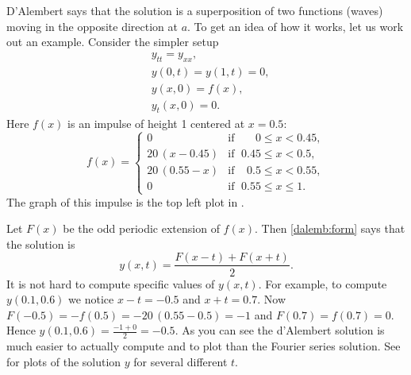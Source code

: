 \begin{example} \label{dalemb:implusexample}
D'Alembert says that the solution is a superposition of
two functions (waves) moving in the opposite direction at  $a$.
To get an idea of
how it works, let us work out an example.  Consider the simpler setup
\begin{align*}
& y_{tt} = y_{xx} , \\
& y(0,t) = y(1,t) = 0 , \\
& y(x,0) = f(x) , \\
& y_t(x,0) = 0 .
\end{align*}
Here $f(x)$ is an impulse of height 1 centered at $x=0.5$:
\begin{equation*}
f(x) =
\begin{cases}
0 & \text{if } \; \phantom{0.5}0 \leq x < 0.45, \\
20\,(x-0.45) & \text{if } \; 0.45 \leq x < 0.5, \\
20\,(0.55-x) & \text{if } \; \phantom{5}0.5 \leq x < 0.55, \\
0 & \text{if } \; 0.55 \leq x \leq 1 .
\end{cases}
\end{equation*}
The graph of this impulse is the top left plot in
.
\end{example}

\begin{exampleSol}
Let $F(x)$ be the odd periodic extension of $f(x)$.  Then
\eqref{dalemb:form} says that
the solution is
\begin{equation*}
y(x,t) = \frac{F(x-t) + F(x+t)}{2} .
\end{equation*}
It is not hard to compute specific values of $y(x,t)$.  For example, to
compute $y(0.1,0.6)$ we notice $x-t = -0.5$ and $x+t = 0.7$.  Now $F(-0.5) =
-f(0.5) = - 20\,(0.55 - 0.5) = -1$
and $F(0.7) = f(0.7) = 0$.  Hence
$y(0.1,0.6) = \frac{-1 + 0}{2} = -0.5$.  As you can see the d'Alembert
solution is much easier to actually compute and to plot than the Fourier series
solution.  See  for plots of the solution $y$
for several different $t$.
\begin{myfig}
\capstart
\\[5pt]
\caption{Plot of the d'Alembert solution for $t=0$, $t=0.2$, $t=0.4$, and
$t=0.6$.%
\label{dalemb:impulsfig}}
\end{myfig}
\end{exampleSol}

